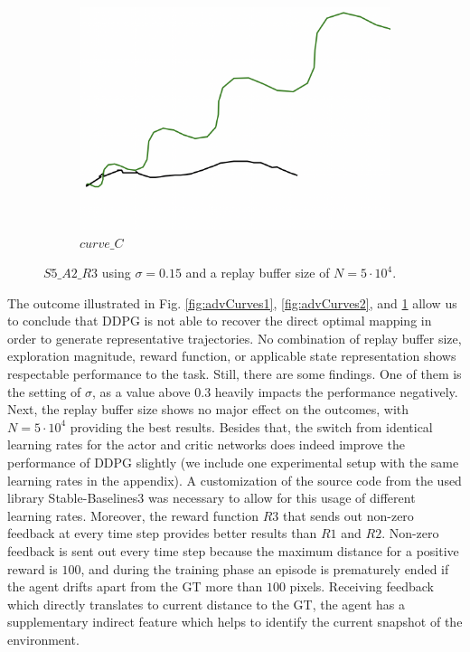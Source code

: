 \begin{figure}[H]
\begin{subfigure}[b]{0.31\textwidth}
         \includegraphics[width=\textwidth]{images/ddpg_results/envs_S3_S4_S5/S5_A2_R3_curve_C.png}
         \caption{$curve\_C$}
     \end{subfigure}
        \caption{$S5\_A2\_R3$ using $\sigma=0.15$ and a replay buffer size of $N=5\cdot 10^4$.}
        \label{fig:advCurves3}
\end{figure}
\newpage
The outcome illustrated in Fig. \ref{fig:advCurves1}, \ref{fig:advCurves2}, and \ref{fig:advCurves3} allow us to conclude that DDPG is not able to recover the direct optimal mapping in order to generate representative trajectories. No combination of replay buffer size, exploration magnitude, reward function, or applicable state representation shows respectable performance to the task. Still, there are some findings. One of them is the setting of $\sigma$, as a value above $0.3$ heavily impacts the performance negatively. Next, the replay buffer size shows no major effect on the outcomes, with $N=5 \cdot 10^4$ providing the best results. Besides that, the switch from identical learning rates for the actor and critic networks does indeed improve the performance of DDPG slightly (we include one experimental setup with the same learning rates in the appendix). A customization of the source code from the used library Stable-Baselines3 was necessary to allow for this usage of different learning rates. Moreover, the reward function $R3$ that sends out non-zero feedback at every time step provides better results than $R1$ and $R2$. Non-zero feedback is sent out every time step because the maximum distance for a positive reward is $100$, and during the training phase an episode is prematurely ended if the agent drifts apart from the GT more than $100$ pixels. Receiving feedback which directly translates to current distance to the GT, the agent has a supplementary indirect feature which helps to identify the current snapshot of the environment.
